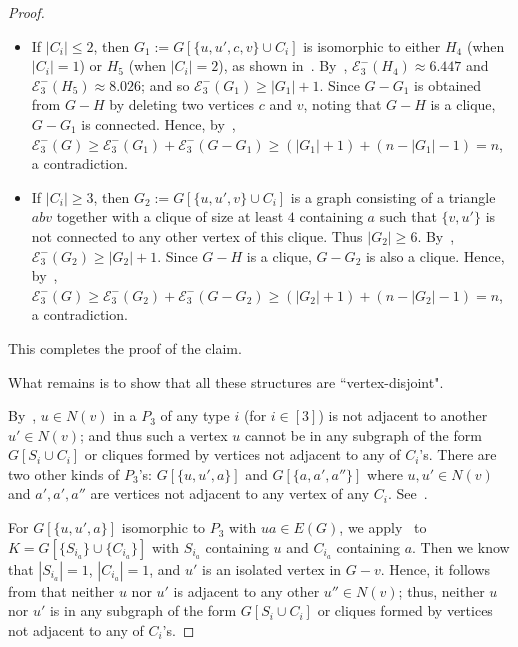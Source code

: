 \documentclass[a4paper,12pt]{article}
\theoremstyle{plain}
\newenvironment{proof*}{\noindent \emph{Proof of the claim.}}{\hfill$\Diamond$}
\begin{document}
\begin{proof}
\begin{proof*}
\begin{itemize}
    \item If $|C_i|\leq 2$, then $G_1:=G[\{u,u',c,v\}\cup C_i]$ is isomorphic to either $H_4$ (when $|C_i|=1$) or $H_5$ (when $|C_i|=2$), as shown in~. By~,  $\mathcal{E}_3^{-}(H_4)\approx 6.447$ and $\mathcal{E}_3^{-}(H_5)\approx 8.026$; and so $\mathcal{E}_3^{-}(G_1)\geq |G_1|+1$. Since $G-G_1$ is obtained from $G-H$ by deleting two vertices $c$ and $v$, noting that $G-H$ is a clique, $G-G_1$ is connected. Hence, by~, $\mathcal{E}_3^{-}(G) \geq \mathcal{E}_3^{-}(G_1) + \mathcal{E}_3^{-}(G-G_1) \geq (|G_1|+1)+(n-|G_1|-1) = n$, a contradiction. 

    \item If $|C_i|\geq 3$, then $G_2:=G[\{u,u',v\}\cup C_i]$ is a graph consisting of a triangle $abv$ together with a clique of size at least $4$ containing $a$ such that $\{v,u'\}$ is not connected to any other vertex of this clique. Thus $|G_2|\geq 6$. By~, $\mathcal{E}_3^{-}(G_2)\geq |G_2|+1$. Since $G-H$ is a clique, $G-G_2$ is also a clique. Hence, by~, $\mathcal{E}_3^{-}(G)\geq\mathcal{E}_3^{-}(G_2)+\mathcal{E}_3^{-}(G-G_2)\geq (|G_2|+1)+(n-|G_2|-1)=n$, a contradiction.
\end{itemize}
This completes the proof of the claim.
\end{proof*}

\medskip
What remains is to show that  all these structures are ``vertex-disjoint". 

By~, $u\in N(v)$ in a $P_3$ of any type $i$ (for $i\in [3]$) is not adjacent to another $u'\in N(v)$; and thus such a vertex $u$ cannot be in any subgraph of the form $G[S_i\cup C_i]$ or cliques formed by vertices not adjacent to any of $C_i$'s. There are two other kinds of $P_3$'s: $G[\{u,u',a\}]$ and $G[\{a,a', a''\}]$ where $u,u'\in N(v)$ and $a', a', a''$ are vertices not adjacent to any vertex of any $C_i$. See~. 

For $G[\{u,u',a\}]$ isomorphic to $P_3$ with $ua\in E(G)$, we apply~ to $K=G[\{S_{i_a}\}\cup \{C_{i_a}\}]$ with $S_{i_a}$ containing $u$ and $C_{i_a}$ containing $a$. Then we know that $|S_{i_a}|=1$, $|C_{i_a}|=1$, and $u'$ is an isolated vertex in $G-v$. Hence, it follows from  that neither $u$ nor $u'$ is adjacent to any other $u''\in N(v)$; thus, neither $u$ nor $u'$ is in any subgraph of the form $G[S_i\cup C_i]$ or cliques formed by vertices not adjacent to any of $C_i$'s.


\end{proof}
\end{document}
